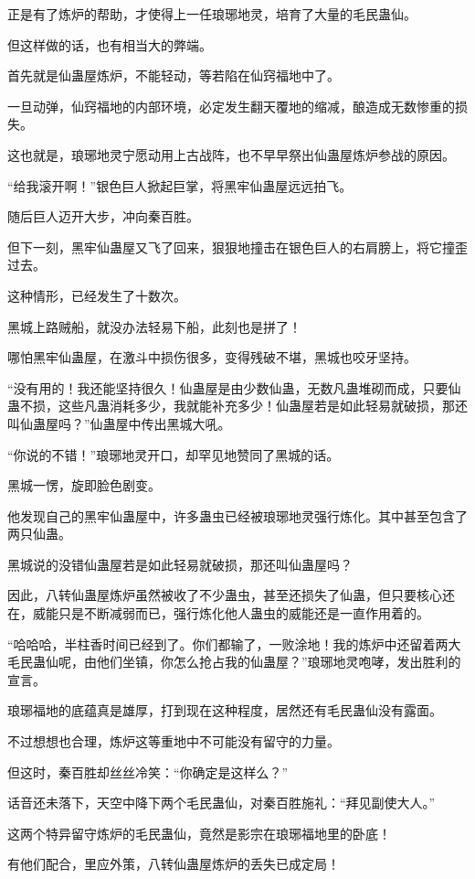 \begin{this_body}
正是有了炼炉的帮助，才使得上一任琅琊地灵，培育了大量的毛民蛊仙。

但这样做的话，也有相当大的弊端。

首先就是仙蛊屋炼炉，不能轻动，等若陷在仙窍福地中了。

一旦动弹，仙窍福地的内部环境，必定发生翻天覆地的缩减，酿造成无数惨重的损失。

这也就是，琅琊地灵宁愿动用上古战阵，也不早早祭出仙蛊屋炼炉参战的原因。

“给我滚开啊！”银色巨人掀起巨掌，将黑牢仙蛊屋远远拍飞。

随后巨人迈开大步，冲向秦百胜。

但下一刻，黑牢仙蛊屋又飞了回来，狠狠地撞击在银色巨人的右肩膀上，将它撞歪过去。

这种情形，已经发生了十数次。

黑城上路贼船，就没办法轻易下船，此刻也是拼了！

哪怕黑牢仙蛊屋，在激斗中损伤很多，变得残破不堪，黑城也咬牙坚持。

“没有用的！我还能坚持很久！仙蛊屋是由少数仙蛊，无数凡蛊堆砌而成，只要仙蛊不损，这些凡蛊消耗多少，我就能补充多少！仙蛊屋若是如此轻易就破损，那还叫仙蛊屋吗？”仙蛊屋中传出黑城大吼。

“你说的不错！”琅琊地灵开口，却罕见地赞同了黑城的话。

黑城一愣，旋即脸色剧变。

他发现自己的黑牢仙蛊屋中，许多蛊虫已经被琅琊地灵强行炼化。其中甚至包含了两只仙蛊。

黑城说的没错仙蛊屋若是如此轻易就破损，那还叫仙蛊屋吗？

因此，八转仙蛊屋炼炉虽然被收了不少蛊虫，甚至还损失了仙蛊，但只要核心还在，威能只是不断减弱而已，强行炼化他人蛊虫的威能还是一直作用着的。

“哈哈哈，半柱香时间已经到了。你们都输了，一败涂地！我的炼炉中还留着两大毛民蛊仙呢，由他们坐镇，你怎么抢占我的仙蛊屋？”琅琊地灵咆哮，发出胜利的宣言。

琅琊福地的底蕴真是雄厚，打到现在这种程度，居然还有毛民蛊仙没有露面。

不过想想也合理，炼炉这等重地中不可能没有留守的力量。

但这时，秦百胜却丝丝冷笑：“你确定是这样么？”

话音还未落下，天空中降下两个毛民蛊仙，对秦百胜施礼：“拜见副使大人。”

这两个特异留守炼炉的毛民蛊仙，竟然是影宗在琅琊福地里的卧底！

有他们配合，里应外策，八转仙蛊屋炼炉的丢失已成定局！

\end{this_body}

